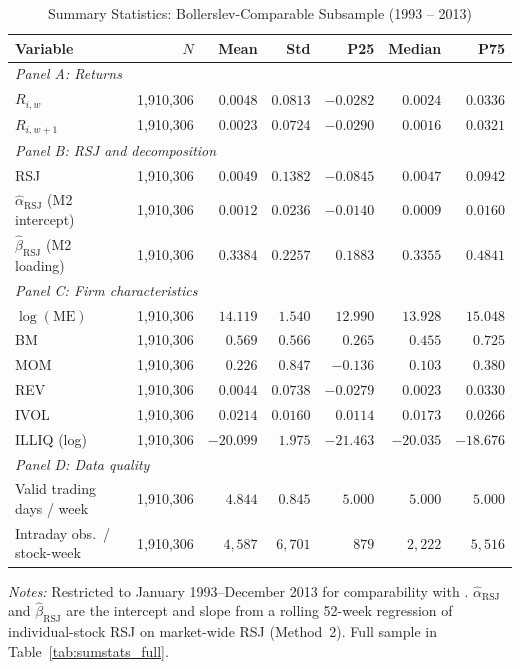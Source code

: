 \documentclass[11pt,a4paper]{article}
\begin{document}
\begin{table}[!htbp]
\centering
\caption{Summary Statistics: Bollerslev-Comparable Subsample (1993 -- 2013)}
\label{tab:sumstats_bollerslev}
\small
\begin{threeparttable}
\begin{tabular}{l r r r r r r}
\toprule
Variable & $N$ & Mean & Std & P25 & Median & P75 \\
\midrule
\multicolumn{7}{l}{\textit{Panel A: Returns}} \\[2pt]
$R_{i,w}$
  & 1{,}910{,}306 & $0.0048$ & $0.0813$ & $-0.0282$ & $0.0024$ & $0.0336$ \\
$R_{i,w+1}$
  & 1{,}910{,}306 & $0.0023$ & $0.0724$ & $-0.0290$ & $0.0016$ & $0.0321$ \\[5pt]
\multicolumn{7}{l}{\textit{Panel B: RSJ and decomposition}} \\[2pt]
RSJ
  & 1{,}910{,}306 & $0.0049$ & $0.1382$ & $-0.0845$ & $0.0047$ & $0.0942$ \\
$\hat\alpha_{\text{RSJ}}$ (M2 intercept)
  & 1{,}910{,}306 & $0.0012$ & $0.0236$ & $-0.0140$ & $0.0009$ & $0.0160$ \\
$\hat\beta_{\text{RSJ}}$ (M2 loading)
  & 1{,}910{,}306 & $0.3384$ & $0.2257$ & $0.1883$  & $0.3355$ & $0.4841$ \\[5pt]
\multicolumn{7}{l}{\textit{Panel C: Firm characteristics}} \\[2pt]
$\log(\text{ME})$
  & 1{,}910{,}306 & $14.119$ & $1.540$ & $12.990$ & $13.928$ & $15.048$ \\
BM
  & 1{,}910{,}306 & $0.569$  & $0.566$ & $0.265$  & $0.455$  & $0.725$  \\
MOM
  & 1{,}910{,}306 & $0.226$  & $0.847$ & $-0.136$ & $0.103$  & $0.380$  \\
REV
  & 1{,}910{,}306 & $0.0044$ & $0.0738$& $-0.0279$& $0.0023$ & $0.0330$ \\
IVOL
  & 1{,}910{,}306 & $0.0214$ & $0.0160$& $0.0114$ & $0.0173$ & $0.0266$ \\
ILLIQ (log)
  & 1{,}910{,}306 & $-20.099$& $1.975$ & $-21.463$& $-20.035$& $-18.676$\\[5pt]
\multicolumn{7}{l}{\textit{Panel D: Data quality}} \\[2pt]
Valid trading days / week
  & 1{,}910{,}306 & $4.844$ & $0.845$ & $5.000$ & $5.000$ & $5.000$ \\
Intraday obs.\ / stock-week
  & 1{,}910{,}306 & $4{,}587$ & $6{,}701$ & $879$ & $2{,}222$ & $5{,}516$ \\
\bottomrule
\end{tabular}
\begin{tablenotes}
\footnotesize
\item \textit{Notes:} Restricted to January 1993--December 2013 for comparability with
\citet{bollerslev2020}. $\hat\alpha_{\text{RSJ}}$ and $\hat\beta_{\text{RSJ}}$ are the
intercept and slope from a rolling 52-week regression of individual-stock RSJ on
market-wide RSJ (Method~2). Full sample in Table~\ref{tab:sumstats_full}.
\end{tablenotes}
\end{threeparttable}
\end{table}
\end{document}
